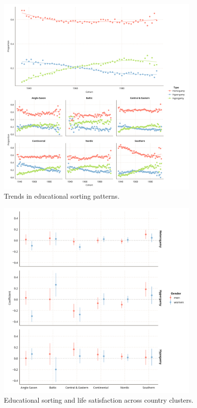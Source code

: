 
\begin{figure}[H]
    \centering
    \includegraphics[width=0.9\textwidth]{chapters/chapter3/figures/trends.png}
    \caption{Trends in educational sorting patterns.}
    \label{fig:trends_edu_sorting}
\end{figure}

\begin{figure}[H]
    \centering
    \includegraphics[width=0.9\textwidth]{chapters/chapter3/figures/dmm_region.png}
    \caption{Educational sorting and life satisfaction across country clusters.}
    \label{fig:dmm_region}
\end{figure}
